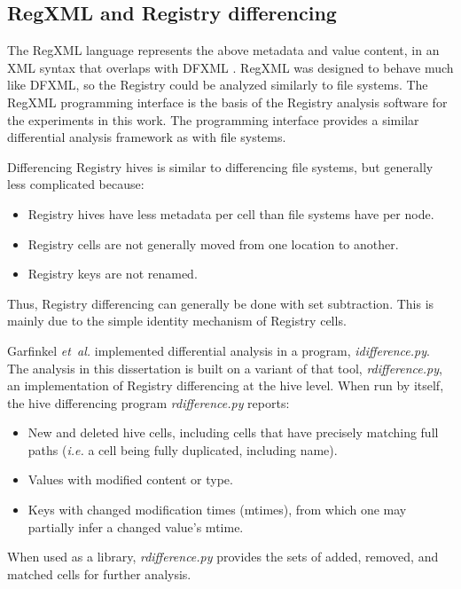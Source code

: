 \documentclass[11pt]{ucthesis}
\theoremstyle{plain}
\theoremstyle{definition}
\newcommand{\etal}{\emph{et~al.}\xspace}
\newcommand{\ie}{\emph{i.e.}\xspace}
\newcommand{\idifference}{\emph{idifference.py}\xspace}
\begin{document}
\subsection{RegXML and Registry differencing}

The RegXML language represents the above metadata and value content, in an XML syntax that overlaps with DFXML \cite{nelson:ifip12}.  RegXML was designed to behave much like DFXML, so the Registry could be analyzed similarly to file systems.  The RegXML programming interface is the basis of the Registry analysis software for the experiments in this work.  The programming interface provides a similar differential analysis framework as with file systems.

Differencing Registry hives is similar to differencing file systems, but generally less complicated because:

\begin{itemize}
\item Registry hives have less metadata per cell than file systems have per node.
\item Registry cells are not generally moved from one location to another.
\item Registry keys are not renamed.
\end{itemize}

Thus, Registry differencing can generally be done with set subtraction.  This is mainly due to the simple identity mechanism of Registry cells.

Garfinkel \etal implemented differential analysis in a program, \idifference \cite{garfinkel:dfrws12a}.  The analysis in this dissertation is built on a variant of that tool, \emph{rdifference.py}, an implementation of Registry differencing at the hive level.  When run by itself, the hive differencing program \emph{rdifference.py} reports:

\begin{itemize}
\item New and deleted hive cells, including cells that have precisely matching full paths (\ie a cell being fully duplicated, including name).
\item Values with modified content or type.
\item Keys with changed modification times (mtimes), from which one may partially infer a changed value's mtime.
\end{itemize}

When used as a library, \emph{rdifference.py} provides the sets of added, removed, and matched cells for further analysis.
\end{document}
